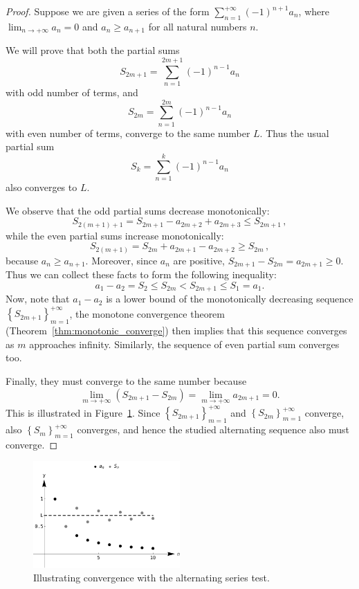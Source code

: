 \begin{proof}
Suppose we are given a series of the form $\displaystyle \sum _{n=1}^{+\infty }(-1)^{n+1}a_{n}$, where $\displaystyle \lim _{n\rightarrow+\infty }a_{n}=0$ and $a_{n}\geq a_{n+1}$ for all natural numbers $n$. 

We will prove that both the partial sums 
$$
\displaystyle S_{2m+1}=\sum _{n=1}^{2m+1}(-1)^{n-1}a_{n}
$$
 with odd number of terms, and 
$$
\displaystyle S_{2m}=\sum _{n=1}^{2m}(-1)^{n-1}a_{n}
$$
 with even number of terms, converge to the same number $L$. Thus the usual partial sum 
$$
\displaystyle S_{k}=\sum _{n=1}^{k}(-1)^{n-1}a_{n}
$$
 also converges to $L$. 

We observe that the odd partial sums decrease monotonically:
$$
\displaystyle S_{2(m+1)+1}=S_{2m+1}-a_{2m+2}+a_{2m+3}\leq S_{2m+1}\,,
$$
 while the even partial sums increase monotonically:
$$
\displaystyle S_{2(m+1)}=S_{2m}+a_{2m+1}-a_{2m+2}\geq S_{2m}\,,
$$
because $a_{n}\geq a_{n+1}$.
Moreover, since $a_n$ are positive, $\displaystyle S_{2m+1}-S_{2m}=a_{2m+1}\geq 0$. Thus we can collect these facts to form the following inequality: 
$$
\displaystyle a_{1}-a_{2}=S_{2}\leq S_{2m}<S_{2m+1}\leq S_{1}=a_{1}.
$$
Now, note that $a_1 - a_2$ is a lower bound of the monotonically decreasing sequence $\left\{S_{2m+1}\right\}_{m=1}^{+\infty}$, the monotone convergence theorem (Theorem~\ref{thm:monotonic_converge}) then implies that this sequence converges as $m$ approaches infinity. Similarly, the sequence of even partial sum converges too. 

Finally, they must converge to the same number because
$$
\displaystyle \lim _{m\to+\infty }(S_{2m+1}-S_{2m})=\lim _{m\to+\infty }a_{2m+1}=0.
$$
This is illustrated in Figure~\ref{fig_series_12}. Since $\left\{S_{2m+1}\right\}_{m=1}^{+\infty}$ and $\left\{S_{2m}\right\}_{m=1}^{+\infty}$ converge, also $\left\{S_{m}\right\}_{m=1}^{+\infty}$ converges, and hence the studied alternating sequence also must converge. 
\end{proof}

\begin{figure}[h]
	\begin{center}
			\includegraphics[width=0.5\textwidth]{fig_series_12}
	\caption{Illustrating convergence with the alternating series test.}
	\label{fig_series_12}
	\end{center}
\end{figure}




